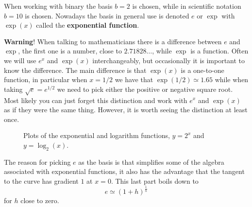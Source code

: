 When working with binary the basis $b=2$ is chosen, while in scientific notation $b=10$ is chosen.  Nowadays the basis in general use is denoted $e$ or $\exp$ with $\exp(x)$ called the \textbf{exponential function}. \\

\begin{mdiv}
\textbf{Warning}! When talking to mathematicians there is a difference between $e$ and $\exp$, the first one is a number, close to $2.71828\dots$, while $\exp$ is a function. Often we will use $e^{x}$ and $\exp(x)$ interchangeably, but occasionally it is important to know the difference.  The main difference is that $\exp(x)$ is a one-to-one function, in particular  when $x=1/2$ we have that $\exp(1/2)\simeq 1.65$ while when taking $\sqrt{e}=e^{1/2}$ we need to pick either the positive or negative square root.  Most likely you can just forget this distinction and work with $e^{x}$ and $\exp(x)$ as if they were the same thing. However, it is worth seeing the distinction at least once.
\end{mdiv}

\begin{figure}[ht]
    \centering
{}
    \caption{Plots of the exponential and logarithm functions, $y=2^{x}$ and $y=\log_{2}(x)$.}
        \label{fig: exp and log 1}
\end{figure}

The reason for picking $e$ as the basis is that simplifies some of the algebra associated with exponential functions, it also has the advantage that the tangent to the curve has gradient $1$ at $x=0$. This last part boils down to 
\begin{equation}
e\simeq \left(1+h\right)^{\frac{1}{h}} 
\label{eq: exp approximation}
\end{equation}
for $h$ close to zero. 

